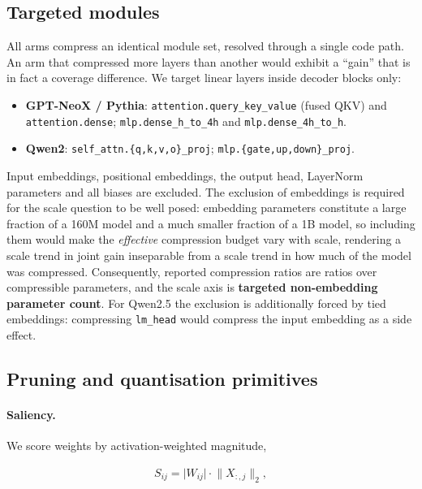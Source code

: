\subsection{Targeted modules}
\label{subsec:modules}

All arms compress an identical module set, resolved through a single code path. An arm that
compressed more layers than another would exhibit a ``gain'' that is in fact a coverage
difference. We target linear layers inside decoder blocks only:

\begin{itemize}\setlength{\itemsep}{2pt}
  \item \textbf{GPT-NeoX / Pythia}: \texttt{attention.query\_key\_value} (fused QKV) and
        \texttt{attention.dense}; \texttt{mlp.dense\_h\_to\_4h} and
        \texttt{mlp.dense\_4h\_to\_h}.
  \item \textbf{Qwen2}: \texttt{self\_attn.\{q,k,v,o\}\_proj};
        \texttt{mlp.\{gate,up,down\}\_proj}.
\end{itemize}

Input embeddings, positional embeddings, the output head, LayerNorm parameters and all
biases are excluded. The exclusion of embeddings is required for the scale question to be
well posed: embedding parameters constitute a large fraction of a 160M model and a much
smaller fraction of a 1B model, so including them would make the \emph{effective}
compression budget vary with scale, rendering a scale trend in joint gain inseparable from a
scale trend in how much of the model was compressed. Consequently, reported compression
ratios are ratios over compressible parameters, and the scale axis is \textbf{targeted
non-embedding parameter count}. For Qwen2.5 the exclusion is additionally forced by tied
embeddings: compressing \texttt{lm\_head} would compress the input embedding as a side
effect.

\subsection{Pruning and quantisation primitives}
\label{subsec:primitives}

\paragraph{Saliency.} We score weights by activation-weighted magnitude,

\begin{align}
  S_{ij} = \lvert W_{ij} \rvert \cdot \lVert X_{:,j} \rVert_2 ,
  \label{eq:saliency}
\end{align}

